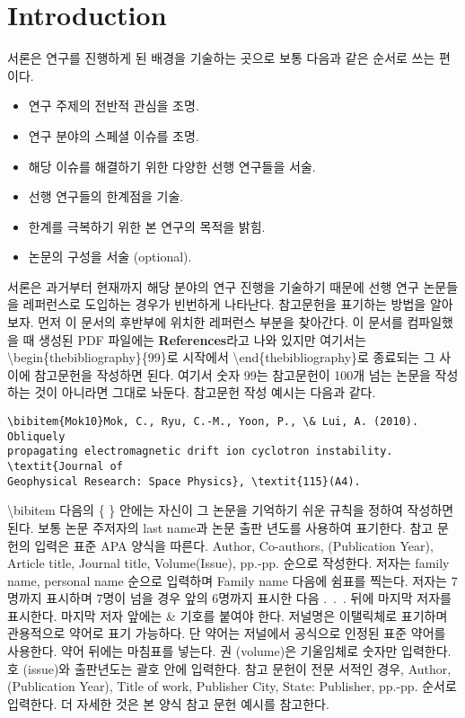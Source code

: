 \section{Introduction}

서론은 연구를 진행하게 된 배경을 기술하는 곳으로 보통 다음과 같은 순서로 쓰는 편이다.
\begin{itemize}
\item{연구 주제의 전반적 관심을 조명.}
\item{연구 분야의 스페셜 이슈를 조명.}
\item{해당 이슈를 해결하기 위한 다양한 선행 연구들을 서술.}
\item{선행 연구들의 한계점을 기술.}
\item{한계를 극복하기 위한 본 연구의 목적을 밝힘.}
\item{논문의 구성을 서술 (optional).}
\end{itemize}
서론은 과거부터 현재까지 해당 분야의 연구 진행을 기술하기 때문에 선행 연구 논문들을 레퍼런스로 도입하는 경우가 빈번하게 나타난다.  참고문헌을 표기하는 방법을 알아보자. 먼저 이 문서의 후반부에 위치한 레퍼런스 부분을 찾아간다. 이 문서를 컴파일했을 때 생성된 PDF 파일에는 {\bf References}라고 나와 있지만 여기서는 {\textbackslash}begin\{thebibliography\}\{99\}로 시작에서 {\textbackslash}end\{thebibliography\}로 종료되는 그 사이에 참고문헌을 작성하면 된다. 여기서 숫자 99는 참고문헌이 100개 넘는 논문을 작성하는 것이 아니라면 그대로 놔둔다. 참고문헌 작성 예시는 다음과 같다.
\begin{lstlisting}[breaklines=false]
\bibitem{Mok10}Mok, C., Ryu, C.-M., Yoon, P., \& Lui, A. (2010). Obliquely 
propagating electromagnetic drift ion cyclotron instability. \textit{Journal of 
Geophysical Research: Space Physics}, \textit{115}(A4).
\end{lstlisting}
{\textbackslash}bibitem 다음의 \{ \} 안에는 자신이 그 논문을 기억하기 쉬운 
규칙을 정하여 작성하면 된다. 보통 논문 주저자의 last name과 논문 출판 년도를 
사용하여 표기한다.
참고 문헌의 입력은 표준 APA 양식을 따른다. Author, Co-authors, (Publication 
Year), Article title, Journal title, Volume(Issue), pp.-pp. 순으로 작성한다. 
저자는 family name, personal name 순으로 입력하며 Family name 다음에 쉼표를 
찍는다. 저자는 7명까지 표시하며 7명이 넘을 경우 앞의 6명까지 표시한 다음 .~.~. 
뒤에 마지막 저자를 표시한다. 마지막 저자 앞에는 \& 기호를 붙여야 한다. 저널명은 
이탤릭체로 표기하며 관용적으로 약어로 표기 가능하다. 단 약어는 저널에서 
공식으로 인정된 표준 약어를 사용한다. 약어 뒤에는 마침표를 넣는다. 권 
(volume)은 기울임체로 숫자만 입력한다. 호 (issue)와 출판년도는 괄호 안에 
입력한다. 참고 문헌이 전문 서적인 경우, Author, (Publication Year), Title of 
work, Publisher City, State: Publisher, pp.-pp. 순서로 입력한다. 더 자세한 것은 
본 양식 참고 문헌 예시를 참고한다.

